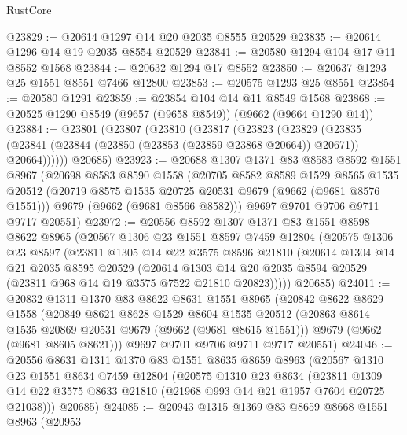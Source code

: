 \begin{lexlean}{RustCore}
\begin{coremodule}
@23829 := @20614 @1297 @14 @20 @2035 @8555 @20529
@23835 := @20614 @1296 @14 @19 @2035 @8554 @20529
@23841 := @20580 @1294 @104 @17 @11 @8552 @1568
@23844 := @20632 @1294 @17 @8552
@23850 := @20637 @1293 @25 @1551 @8551 @7466 @12800
@23853 := @20575 @1293 @25 @8551
@23854 := @20580 @1291
@23859 := @23854 @104 @14 @11 @8549 @1568
@23868 := @20525 @1290 @8549 (@9657 (@9658 @8549)) (@9662 (@9664 @1290 @14))
@23884 := @23801
    (@23807
      (@23810
        (@23817
          (@23823
            (@23829
              (@23835 (@23841 (@23844 (@23850 (@23853 (@23859 @23868 @20664)) @20671)) @20664))))))
      @20685)
@23923 := @20688
    @1307
    @1371
    @83
    @8583
    @8592
    @1551
    @8967
    (@20698
      @8583
      @8590
      @1558
      (@20705
        @8582
        @8589
        @1529
        @8565
        @1535
        @20512
        (@20719 @8575 @1535 @20725 @20531 @9679 (@9662 (@9681 @8576 @1551)))
        @9679
        (@9662 (@9681 @8566 @8582)))
      @9697
      @9701
      @9706
      @9711
      @9717
      @20551)
@23972 := @20556
    @8592
    @1307
    @1371
    @83
    @1551
    @8598
    @8622
    @8965
    (@20567
      @1306
      @23
      @1551
      @8597
      @7459
      @12804
      (@20575
        @1306
        @23
        @8597
        (@23811
          @1305
          @14
          @22
          @3575
          @8596
          @21810
          (@20614
            @1304
            @14
            @21
            @2035
            @8595
            @20529
            (@20614
              @1303
              @14
              @20
              @2035
              @8594
              @20529
              (@23811 @968 @14 @19 @3575 @7522 @21810 @20823)))))
      @20685)
@24011 := @20832
    @1311
    @1370
    @83
    @8622
    @8631
    @1551
    @8965
    (@20842
      @8622
      @8629
      @1558
      (@20849
        @8621
        @8628
        @1529
        @8604
        @1535
        @20512
        (@20863 @8614 @1535 @20869 @20531 @9679 (@9662 (@9681 @8615 @1551)))
        @9679
        (@9662 (@9681 @8605 @8621)))
      @9697
      @9701
      @9706
      @9711
      @9717
      @20551)
@24046 := @20556
    @8631
    @1311
    @1370
    @83
    @1551
    @8635
    @8659
    @8963
    (@20567
      @1310
      @23
      @1551
      @8634
      @7459
      @12804
      (@20575
        @1310
        @23
        @8634
        (@23811 @1309 @14 @22 @3575 @8633 @21810 (@21968 @993 @14 @21 @1957 @7604 @20725 @21038)))
      @20685)
@24085 := @20943
    @1315
    @1369
    @83
    @8659
    @8668
    @1551
    @8963
    (@20953

\end{coremodule}
\end{lexlean}
